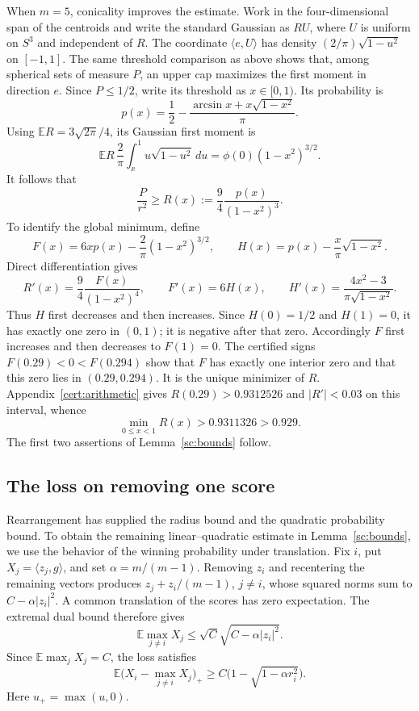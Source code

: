 When \(m=5\), conicality improves the estimate. Work in the
four-dimensional span of the centroids and write the standard Gaussian
as \(RU\), where \(U\) is uniform on \(S^3\) and independent of \(R\).
The coordinate \(\langle e,U\rangle\) has density
\((2/\pi)\sqrt{1-u^2}\) on \([-1,1]\). The same threshold comparison as
above shows that, among spherical sets of measure \(P\), an upper cap
maximizes the first moment in direction \(e\). Since \(P\le1/2\), write
its threshold as \(x\in[0,1)\). Its probability is
\[
 p(x)=\frac12-\frac{\arcsin x+x\sqrt{1-x^2}}\pi.
\]
Using \(\mathbb ER=3\sqrt{2\pi}/4\), its Gaussian first moment is
\[
 \mathbb ER\,\frac2\pi\int_x^1 u\sqrt{1-u^2}\,du
 =\phi(0)(1-x^2)^{3/2}.
\]
It follows that
\begin{equation}\label{sc:cap-ratio}
 \frac P{r^2}\ge R(x):=\frac94\frac{p(x)}{(1-x^2)^3}.
\end{equation}
To identify the global minimum, define
\[
 F(x)=6xp(x)-\frac2\pi(1-x^2)^{3/2},\qquad
 H(x)=p(x)-\frac x\pi\sqrt{1-x^2}.
\]
Direct differentiation gives
\[
 R'(x)=\frac94\frac{F(x)}{(1-x^2)^4},\qquad
 F'(x)=6H(x),\qquad
 H'(x)=\frac{4x^2-3}{\pi\sqrt{1-x^2}}.
\]
Thus \(H\) first decreases and then increases. Since \(H(0)=1/2\)
and \(H(1)=0\), it has exactly one zero in \((0,1)\); it is negative
after that zero. Accordingly \(F\) first increases and then decreases
to \(F(1)=0\). The certified signs \(F(0.29)<0<F(0.294)\) show that
\(F\) has exactly one interior zero and that this zero lies in
\((0.29,0.294)\). It is the unique minimizer of \(R\).
Appendix~\ref{cert:arithmetic} gives \(R(0.29)>0.9312526\) and
\(|R'|<0.03\) on this interval, whence
\begin{equation}\label{sc:cap-minimum}
 \min_{0\le x<1}R(x)>0.9311326>0.929.
\end{equation}
The first two assertions of Lemma~\ref{sc:bounds} follow.

\subsection{The loss on removing one score}
Rearrangement has supplied the radius bound and the quadratic
probability bound. To obtain the remaining linear--quadratic estimate
in Lemma~\ref{sc:bounds}, we use the behavior of the
winning probability under translation. Fix \(i\), put
\(X_j=\langle z_j,g\rangle\), and set \(\alpha=m/(m-1)\).
Removing \(z_i\) and recentering the remaining vectors produces
\(z_j+z_i/(m-1)\), \(j\ne i\), whose squared norms sum to
\(C-\alpha|z_i|^2\). A common translation of the scores has zero
expectation. The extremal dual bound therefore gives
\[
 \mathbb E\max_{j\ne i}X_j\le
 \sqrt C\sqrt{C-\alpha|z_i|^2}.
\]
Since \(\mathbb E\max_jX_j=C\), the loss satisfies
\begin{equation}\label{sc:loss-lower}
 \mathbb E\bigl(X_i-\max_{j\ne i}X_j\bigr)_+
 \ge C\bigl(1-\sqrt{1-\alpha r_i^2}\bigr).
\end{equation}
Here \(u_+=\max(u,0)\).


